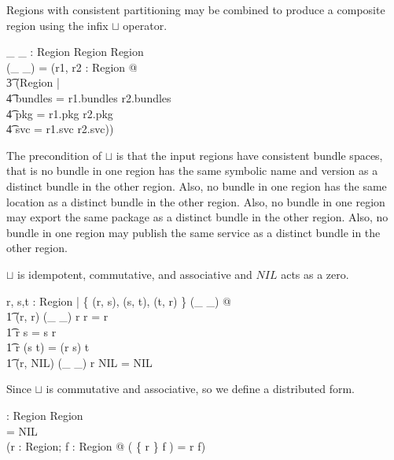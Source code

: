 \documentclass[a4paper,9pt]{article}
\begin{document}
Regions with consistent partitioning may be combined to produce a composite region using the infix $\sqcup$ operator.
\begin{axdef}
 \_ \sqcup \_ : Region \cross Region \pfun Region \\
\where
 (\_ \sqcup \_) = (\lambda r1, r2 : Region @ \\
\t3 (\mu Region | \\
\t4 bundles = r1.bundles \cup r2.bundles \land \\
\t4 pkg = r1.pkg \cup r2.pkg \land \\
\t4 svc = r1.svc \cup r2.svc)) \\
\end{axdef}
The precondition of $\sqcup$ is that the input regions have consistent bundle spaces, that is no bundle in one
region has the same symbolic name and version as a distinct bundle in the other region.
Also, no bundle in one region has the same location as a distinct bundle in the other region.
Also, no bundle in one region may export the same package as a distinct bundle in the other region.
Also, no bundle in one region may publish the same service as a distinct bundle in the other region.

$\sqcup$ is idempotent, commutative, and associative and $NIL$ acts as a zero.
\begin{argue}
  \shows \forall r, s,t : Region | \{ (r, s), (s, t), (t, r) \} \subseteq \dom(\_ \sqcup \_) @ \\
\t1 (r, r) \in \dom(\_ \sqcup \_) \land r \sqcup r = r \land \\
\t1 r \sqcup s = s \sqcup r \land \\
\t1 r \sqcup (s \sqcup t) = (r \sqcup s) \sqcup t \land \\
\t1 (r, NIL) \in \dom(\_ \sqcup \_) \land r \sqcup NIL = NIL \\
\end{argue}

Since $\sqcup$ is commutative and associative, so we define a distributed form.
\begin{axdef}
  \bigsqcup : \finset Region \pfun Region \\
\where
  \bigsqcup \emptyset = NIL \land \\
  (\forall r : Region; f : \finset Region @ \bigsqcup( \{ r \} \cup f ) = r \sqcup \bigsqcup f) \\ 
\end{axdef}
  
\clearpage
\end{document}
